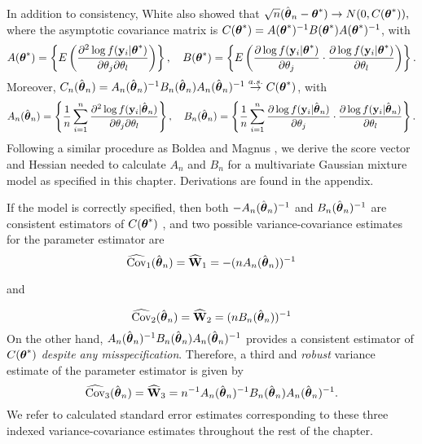 In addition to consistency, White \cite{white1982} also showed that $\sqrt{n}(\hat{\boldsymbol\theta}_{n}-\boldsymbol\theta^{*})\rightarrow N(0, C(\boldsymbol\theta^{*})),$ where the asymptotic covariance matrix is
$C(\boldsymbol\theta^{*})=A(\boldsymbol\theta^{*})^{-1}B(\boldsymbol\theta^{*})A(\boldsymbol\theta^{*})^{-1}$, with
$$A(\boldsymbol\theta^{*})=\left\{E\left(\frac{\partial^{2}\log f(\mathbf y_{i}|\boldsymbol\theta^{*})}{\partial \theta_{j}\partial\theta_{l}}\right)\right\},\quad B(\boldsymbol\theta^{*})=\left\{E\left(\frac{\partial\log f(\mathbf y_{i}|\boldsymbol\theta^{*})}{\partial \theta_{j}}\cdot \frac{\partial\log f(\mathbf y_{i}|\boldsymbol\theta^{*})}{\partial \theta_{l}}\right)\right\}.$$
Moreover, $C_{n}(\hat{\boldsymbol\theta}_{n})=A_{n}(\hat{\boldsymbol\theta}_{n})^{-1}B_{n}(\hat{\boldsymbol\theta}_{n})A_{n}(\hat{\boldsymbol\theta}_{n})^{-1}\stackrel{a.s.}{\rightarrow} C(\boldsymbol\theta^{*})$, with
$$A_{n}(\hat{\boldsymbol\theta}_{n})=\left\{\frac{1}{n}\sum^{n}_{i=1}\frac{\partial^{2}\log f(\mathbf y_{i}|\hat{\boldsymbol\theta}_{n})}{\partial \theta_{j}\partial\theta_{l}}\right\},\quad B_{n}(\hat{\boldsymbol\theta}_{n})=\left\{\frac{1}{n}\sum^{n}_{i=1}\frac{\partial\log f(\mathbf y_{i}|\hat{\boldsymbol\theta}_{n})}{\partial \theta_{j}}\cdot \frac{\partial\log f(\mathbf y_{i}|\hat{\boldsymbol\theta}_{n})}{\partial \theta_{l}}\right\}.$$
 Following a similar procedure as Boldea and Magnus \cite{boldea2009}, we derive the score vector and Hessian needed to calculate $A_{n}$ and $B_{n}$ for a multivariate Gaussian mixture model as specified in this chapter. Derivations are found in the appendix.
 
If the model is correctly specified, then both $-A_{n}(\hat{\boldsymbol\theta}_{n})^{-1}$ and $B_{n}(\hat{\boldsymbol\theta}_{n})^{-1}$ are consistent estimators of $C(\boldsymbol\theta^{*})$ \cite{white1982}, and two possible variance-covariance estimates for the parameter estimator are
$$\widehat{\text{Cov}}_{1}(\hat{\boldsymbol\theta}_{n}) = \widehat{\mathbf W}_{1}=-(nA_{n}(\hat{\boldsymbol\theta}_{n}))^{-1}$$
\begin{center}and\end{center}
$$\widehat{\text{Cov}}_{2}(\hat{\boldsymbol\theta}_{n})= \widehat{\mathbf W}_{2}=(nB_{n}(\hat{\boldsymbol\theta}_{n}))^{-1}$$
On the other hand, $A_{n}(\hat{\boldsymbol\theta}_{n})^{-1}B_{n}(\hat{\boldsymbol\theta}_{n})A_{n}(\hat{\boldsymbol\theta}_{n})^{-1}$ provides a consistent estimator of $C(\boldsymbol\theta^{*})$ {\em despite any misspecification}. Therefore, a third and {\em robust} variance estimate of the parameter estimator is given by
$$\widehat{\text{Cov}}_{3}(\hat{\boldsymbol\theta}_{n})= \widehat{\mathbf W}_{3}=n^{-1}A_{n}(\hat{\boldsymbol\theta}_{n})^{-1}B_{n}(\hat{\boldsymbol\theta}_{n})A_{n}(\hat{\boldsymbol\theta}_{n})^{-1}.$$
 We refer to calculated standard error estimates corresponding to these three indexed variance-covariance estimates throughout the rest of the chapter.
 
